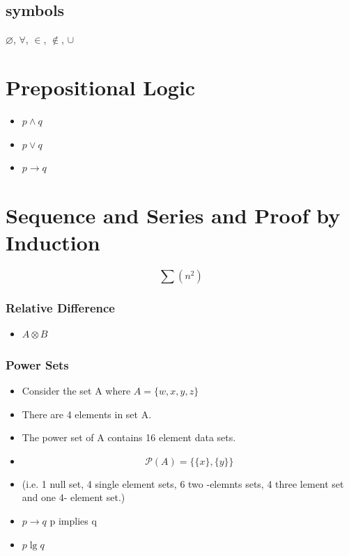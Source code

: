 \documentclass[]{report}
\begin{document}
\subsection*{symbols}
$\varnothing$,
$\forall$,
$\in$,
$\notin$,
$\cup$
\newpage

\section*{Prepositional Logic}


\begin{itemize}
	\item $p \wedge q$
	\item $p \vee q$
	\item $p \rightarrow q$
\end{itemize}
\newpage
\section{Sequence and Series and Proof by Induction}


\[\sum (n^2) \]

\subsubsection*{Relative Difference}
\begin{itemize}
	\item $ A \otimes B$
\end{itemize}
\subsubsection*{Power Sets}
\begin{itemize}
	\item Consider the set A where $ A = \{w,x,y,z\}$
	\item There are 4 elements in set A.
	\item The power set of A contains 16 element data sets.
	\item \[  \mathcal{P}(A) = \{\{ x \}, \{ y \} \}  \]
	\item (i.e. 1 null set, 4 single element sets, 6 two -elemnts sets, 4 three lement set and one 4- element set.)
\end{itemize}
\newpage
\begin{itemize}
	\item $ p \rightarrow q$  p implies q
	\item $p \lg q $
\end{itemize}
\newpage
\end{document}
